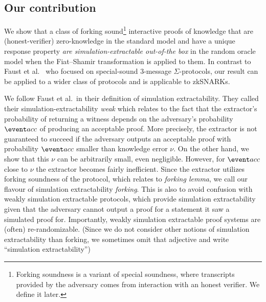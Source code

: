 \documentclass[runningheads,10pt]{llncs}
\begin{document}
\subsection{Our contribution}
We show that a class of forking sound\footnote{Forking soundness is a variant of
  special soundness, where transcripts provided by the adversary comes from
  interaction with an honest verifier. We define it later.} interactive proofs
of knowledge that are (honest-verifier) zero-knowledge in the standard model and
have a unique response property \emph{are simulation-extractable out-of-the box}
in the random oracle model when the Fiat--Shamir transformation is applied to
them. In contrast to Faust et al.~\cite{INDOCRYPT:FKMV12} who focused on
special-sound $3$-message $\Sigma$-protocols, our result can be applied to a
wider class of protocols and is applicable to zkSNARKs.

We follow Faust et al.~in their definition of simulation extractability. They
called their simulation-extractability \emph{weak} which relates to the fact
that the extractor's 
probability of returning a witness depends on the adversary's probability
$\accProb$ of producing an acceptable proof. More precisely, the extractor is
not guaranteed to succeed if the adversary outputs an acceptable proof with
probability $\accProb$ smaller than knowledge error $\nu$. On the other hand, we
show that this $\nu$ can be arbitrarily small, even negligible. However, for
$\accProb$ close to $\nu$ the extractor becomes fairly inefficient. Since the
extractor utilizes forking soundness of the protocol, which relates to
\emph{forking lemma}, we call our flavour of simulation extractability
\emph{forking}. This is also to avoid confusion with weakly simulation
extractable protocols, which provide simulation extractability given that the
adversary cannot output a proof for a statement it saw a simulated proof
for. Importantly, weakly simulation extractable proof systems are (often)
re-randomizable. (Since we do not consider other notions of simulation
extractability than forking, we sometimes omit that adjective and write
``simulation extractability'')
\end{document}

